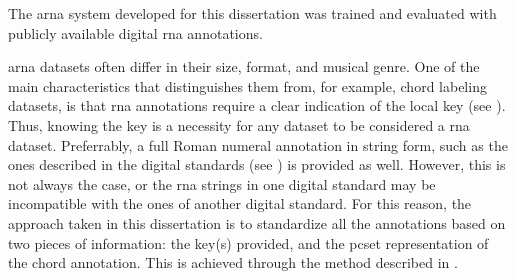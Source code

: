 

The \gls{arna} system developed for this dissertation was
trained and evaluated with publicly available digital
\gls{rna} annotations. 

\gls{arna} datasets often  differ in their size, format, and
musical genre. One of the main characteristics that
distinguishes them from, for example, chord labeling
datasets, is that \gls{rna} annotations require a clear
indication of the local key (see ).
Thus, knowing the key is a necessity for any dataset to be
considered a \gls{rna} dataset. Preferrably, a full Roman
numeral annotation in string form, such as the ones
described in the digital standards (see
) is provided as well.
However, this is not always the case, or the \gls{rna}
strings in one digital standard may be incompatible with the
ones of another digital standard. For this reason, the
approach taken in this dissertation is to standardize all
the annotations based on two pieces of information: the
key(s) provided, and the \gls{pcset} representation of the
chord annotation. This is achieved through the method
described in
.
